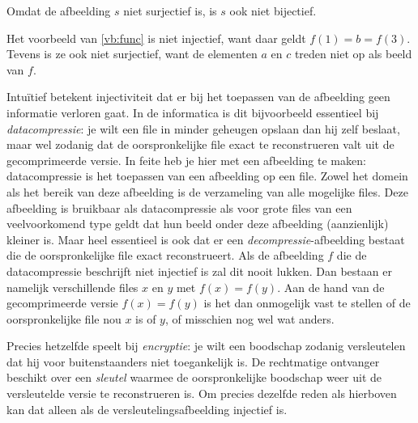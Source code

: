 Omdat de afbeelding $s$ niet surjectief is, is $s$ ook niet bijectief.

Het voorbeeld van \ref{vb:func} is niet injectief, want daar geldt $f(1)=b=f(3)$. Tevens is ze ook niet surjectief, want de elementen $a$ en $c$ treden niet op als beeld van $f$.

Intu\"itief betekent injectiviteit dat er bij het toepassen van de afbeelding geen informatie verloren gaat. In de informatica is dit bijvoorbeeld essentieel bij \textit{datacompressie}: je wilt een file in minder geheugen opslaan dan hij zelf beslaat, maar wel zodanig dat de oorspronkelijke file exact te reconstrueren valt uit de gecomprimeerde versie. In feite heb je hier met een afbeelding te maken: datacompressie is het toepassen van een afbeelding op een file. Zowel het domein als het bereik van deze afbeelding is de verzameling van alle mogelijke files. Deze afbeelding is bruikbaar als datacompressie als voor grote files van een veelvoorkomend type geldt dat hun beeld onder deze afbeelding (aanzienlijk) kleiner is. Maar heel essentieel is ook dat er een \textit{decompressie}-afbeelding bestaat die de oorspronkelijke file exact reconstrueert. Als de afbeelding $f$ die de datacompressie beschrijft niet injectief is zal dit nooit lukken. Dan bestaan er namelijk verschillende files $x$ en $y$ met $f(x)=f(y)$. Aan de hand van de gecomprimeerde versie $f(x)=f(y)$ is het dan onmogelijk vast te stellen of de oorspronkelijke file nou $x$ is of $y$, of misschien nog wel wat anders.

Precies hetzelfde speelt bij \textit{encryptie}: je wilt een boodschap zodanig versleutelen dat hij voor buitenstaanders niet toegankelijk is. De rechtmatige ontvanger beschikt over een \textit{sleutel} waarmee de oorspronkelijke boodschap weer uit de versleutelde versie te reconstrueren is. Om precies dezelfde reden als hierboven kan dat alleen als de versleutelingsafbeelding injectief is. 

